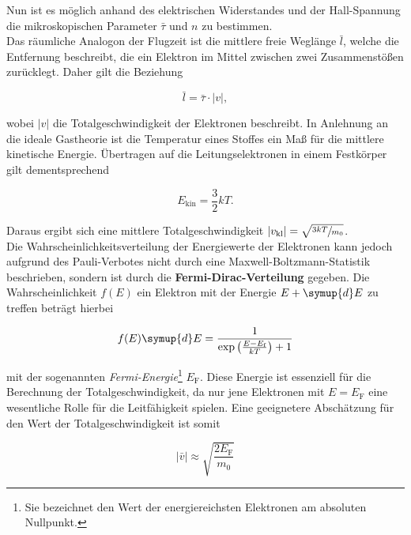 \noindent Nun ist es möglich anhand des elektrischen Widerstandes und der Hall-Spannung die 
mikroskopischen Parameter $\bar{\tau}$ und $n$ zu bestimmen.\\

\noindent Das räumliche Analogon der Flugzeit ist die mittlere freie Weglänge $\bar{l}$, welche die Entfernung beschreibt, die ein 
Elektron im Mittel zwischen zwei Zusammenstößen zurücklegt.
Daher gilt die Beziehung

\begin{equation}
\label{eqn:Weglaenge}
    \bar{l} = \bar{\tau}\cdot|v|,
\end{equation}

\noindent wobei $|v|$ die Totalgeschwindigkeit der Elektronen beschreibt. In Anlehnung an die ideale 
Gastheorie ist die Temperatur eines Stoffes ein Maß für die mittlere kinetische Energie. Übertragen auf die 
Leitungselektronen in einem Festkörper gilt dementsprechend

\begin{equation*}
    E_\text{kin} = \frac{3}{2}kT.
\end{equation*}

\noindent Daraus ergibt sich eine mittlere Totalgeschwindigkeit $|v_\text{kl}| = \sqrt{\sfrac{3kT}{m_0}}$.\\

\noindent Die Wahrscheinlichkeitsverteilung der Energiewerte der Elektronen kann jedoch aufgrund des Pauli-Verbotes
nicht durch eine Maxwell-Boltzmann-Statistik beschrieben, sondern ist durch die \textbf{Fermi-Dirac-Verteilung} 
gegeben. Die Wahrscheinlichkeit $f(E)$ ein Elektron mit der Energie $E + \symup{d}E$ zu treffen 
beträgt hierbei 

\begin{equation*}
    f(E)\symup{d}E = \frac{1}{\exp{\left(\frac{E-E_\text{f}}{kT}\right)}+1}
\end{equation*}

\noindent mit der sogenannten \emph{Fermi-Energie}\footnote{Sie bezeichnet den Wert der energiereichsten Elektronen
am absoluten Nullpunkt.} $E_\text{F}$. Diese Energie ist essenziell für die Berechnung der Totalgeschwindigkeit, da nur jene 
Elektronen mit $E = E_\text{F}$ eine wesentliche Rolle für die Leitfähigkeit spielen. Eine geeignetere Abschätzung für 
den Wert der Totalgeschwindigkeit ist somit 

\begin{equation}
    \label{eqn:totv}
    |\bar{v}| \approx \sqrt{\frac{2E_\text{F}}{m_0}}
\end{equation}

